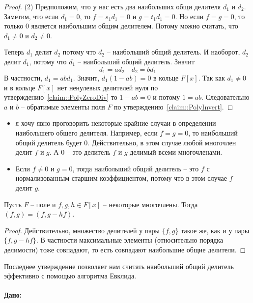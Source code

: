 \begin{proof}
(2) Предположим, что у нас есть два наибольших общи делителя $d_1$ и $d_2$.
Заметим, что если $d_1 = 0$, то $f = s_1 d_1 = 0$ и $g = t_1 d_1 = 0$.
Но если $f = g = 0$, то только $0$ является наибольшим общим делителем.
Потому можно считать, что $d_1\neq 0$ и $d_2\neq 0$.

Теперь $d_1$ делит $d_2$ потому что $d_2$ -- наибольший общий делитель.
И наоборот, $d_2$ делит $d_1$, потому что $d_1$ -- наибольший общий делитель.
Значит
\[
d_1 = a d_2\quad d_2 = b d_1
\]
В частности, $d_1 = ab d_1$.
Значит, $d_1(1 - ab)= 0$ в кольце $F[x]$.
Так как $d_1 \neq 0$ и в кольце $F[x]$ нет ненулевых делителей нуля по утверждению~\ref{claim::PolyZeroDiv} то $1 - ab = 0$ и потому $1 = ab$.
Следовательно $a$ и $b$ -- обратимые элементы поля $F$ по утверждению~\ref{claim::PolyInvert}.
\end{proof}

\begin{remarks}
\begin{itemize}
\item я хочу явно проговорить некоторые крайние случаи в определении наибольшего общего делителя.
Например, если $f = g = 0$, то наибольший общий делитель будет $0$.
Действительно, в этом случае любой многочлен делит $f$ и $g$.
А $0$ -- это делитель $f$ и $g$ делимый всеми многочленами.

\item Если $f \neq 0$ и $g = 0$, тогда наибольший общий делитель -- это $f$ с нормализованным старшим коэффициентом, потому что в этом случае $f$ делит $g$.
\end{itemize}
\end{remarks}

\begin{claim}
\label{claim::GcdEuclid}
Пусть $F$ -- поле и $f, g, h\in F[x]$ -- некоторые многочлены.
Тогда $(f, g) = (f, g - hf)$.
\end{claim}
\begin{proof}
Действительно, множество делителей у пары $\{f, g\}$ такое же, как и у пары $\{f, g-hf\}$.
В частности максимальные элементы (относительно порядка делимости) тоже совпадают, то есть совпадают наибольшие общие делители.
\end{proof}

Последнее утверждение позволяет нам считать наибольший общий делитель эффективно с помощью алгоритма Евклида.

\paragraph{Дано:}

